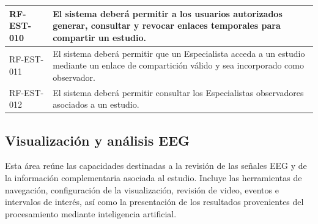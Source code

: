\begin{longtable}{|p{}|p{}|}
    RF-EST-010 &
    El sistema deberá permitir a los usuarios autorizados generar, consultar
    y revocar enlaces temporales para compartir un estudio. \\
    \hline

    RF-EST-011 &
    El sistema deberá permitir que un Especialista acceda a un estudio mediante
    un enlace de compartición válido y sea incorporado como observador. \\
    \hline

    RF-EST-012 &
    El sistema deberá permitir consultar los Especialistas observadores
    asociados a un estudio. \\
    \hline
\end{longtable}


\subsection{Visualización y análisis EEG}
\label{subsec:rf-visualizacion}

Esta área reúne las capacidades destinadas a la revisión de las señales EEG
y de la información complementaria asociada al estudio. Incluye las
herramientas de navegación, configuración de la visualización, revisión de
video, eventos e intervalos de interés, así como la presentación de los
resultados provenientes del procesamiento mediante inteligencia artificial.

